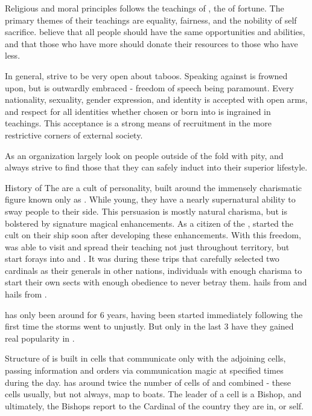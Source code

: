 \documentclass[blue]{GL2020}
\begin{document}
\name{\bCult{}}

Religious and moral principles
\pCult{} follows the teachings of \cCultGod, the \cCultGod{\god} of fortune. The primary themes of their teachings are equality, fairness, and the nobility of self sacrifice. \pCult believe that all people should have the same opportunities and abilities, and that those who have more should donate their resources to those who have less. %

In general, \pCult strive to be very open about taboos. Speaking against \pCult is frowned upon, but is outwardly embraced - freedom of speech being paramount. Every nationality, sexuality, gender expression, and identity is accepted with open arms, and respect for all identities whether chosen or born into is ingrained in \pCult teachings. This acceptance is a strong means of recruitment in the more restrictive corners of external society.

As an organization \pCult largely look on people outside of the fold with pity, and always strive to find those that they can safely induct into their superior lifestyle.

History of \pCult
The \pCult are a cult of personality, built around the immensely charismatic figure known only as \cCultLeader. While young, they have a nearly supernatural ability to sway people to their side. This persuasion is mostly natural charisma, but is bolstered by signature magical enhancements. As a citizen of the \pViking, \cCultLeader started the cult on their ship soon after developing these enhancements. With this freedom, \cCultLeader{\they} was able to visit and spread their teaching not just throughout \pViking territory, but start forays into \pTech and \pFarm. It was during these trips that \cCultLeader carefully selected two cardinals as their generals in other nations, individuals with enough charisma to start their own sects with enough obedience to never betray them. \cTechCardinal hails from \pTech and \cFarmCardinal hails from \pFarm.

\pCult has only been around for 6 years, having been started immediately following the first time the storms went to \pViking unjustly. But only in the last 3 have they gained real popularity in \pViking.

Structure of \pCult
\pCult is built in cells that communicate only with the adjoining cells, passing information and orders via communication magic at specified times during the day. \pViking has around twice the number of cells of \pTech and \pFarm combined - these cells usually, but not always, map to boats. The leader of a cell is a Bishop, and ultimately, the Bishops report to the Cardinal of the country they are in, or \cCultLeader \cCultLeader{\them}self.
\end{document}
